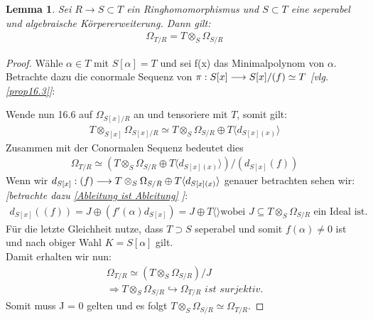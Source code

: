 \documentclass[10pt,a4paper]{report}
\newcounter{Aussage}[chapter]
\newtheorem{lemma}[Aussage]{Lemma}
\newcommand{\functionfront}[3]{\nolinebreak{#1:#2 \longrightarrow #3}}
\newcommand{\divR}[2]{\Omega_{#1/#2}}
\newcommand{\divf}[1]{d_{#1}}
\newcommand{\Tensor}[3]{#1 \otimes_{#2} #3}
\newcommand{\tensor}[3]{#1 \otimes #3}
\begin{document}
\begin{lemma}
Sei $R \longrightarrow S \subset T$ ein Ringhomomorphismus und $S \subset T$ eine seperabel und algebraische Körpererweiterung. Dann gilt:
\begin{gather*}
\divR{T}{R} = \Tensor{T}{S}{\divR{S}{R}}
\end{gather*}
\end{lemma}
\begin{proof}
Wähle $\alpha \in T$ mit $S[\alpha] = T$ und sei f(x) das Minimalpolynom von $\alpha$. Betrachte dazu die conormale Sequenz von  $\functionfront{\pi}{S[x]}{S[x]/(f) \simeq T}$ \textit{[vlg. \cref{prop16.3}]}:
\begin{center}
\end{center}
Wende nun 16.6 auf $\divR{S[x]}{R}$ an und tensoriere mit $T$, somit gilt:
\begin{gather*}
\Tensor{T}{S[x]}{\divR{S[x]}{R}} \simeq \Tensor{T}{S}{\divR{S}{R}} \oplus T\langle \divf{S[x](x)} \rangle
\end{gather*}
Zusammen mit der Conormalen Sequenz bedeutet dies
\begin{gather*}
\divR{T}{R} \simeq (\Tensor{T}{S}{\divR{S}{R}} \oplus T\langle \divf{S[x](x)} \rangle)/(\divf{S[x]}(f))
\end{gather*}
Wenn wir $\functionfront{\divf{S[x]}}{(f)}{\Tensor{T}{S}{\divR{S}{R}} \oplus T\langle \divf{S[x](x)} \rangle}$ genauer betrachten sehen wir: \textit{[betrachte dazu \cref{Ableitung ist Ableitung} ]}:
\begin{gather*}
\divf{S[x]}((f)) = J \oplus (f'(\alpha)\divf{S[x]}) = J \oplus T\langle\rangle
\text{wobei $J \subseteq \Tensor{T}{S}{\divR{S}{R}}$ ein Ideal ist.}
\end{gather*}
Für die letzte Gleichheit nutze, dass $T \supset S$ seperabel und somit $f(\alpha) \neq 0$ ist und nach obiger Wahl $K = S[\alpha]$ gilt.\\
Damit erhalten wir nun:
\begin{gather*}
\divR{T}{R} \simeq (\Tensor{T}{S}{\divR{S}{R}})/J \\
\Rightarrow \Tensor{T}{S}{\divR{S}{R}} \hookrightarrow \divR{T}{R} \textit{ ist surjektiv.}
\end{gather*}
Somit muss J = 0 gelten und es folgt $\Tensor{T}{S}{\divR{S}{R}} \simeq \divR{T}{R}$.
\end{proof}
\end{document}
